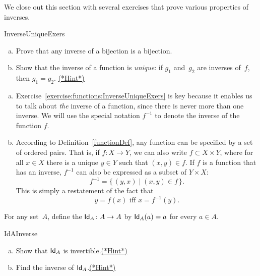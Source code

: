 We close out this section with several exercises that prove various properties of inverses.

 \begin{exercise}{InverseUniqueExers} 
 \begin{enumerate}[(a)]
 \item \label{InverseUniqueExers-bij}
 Prove that any inverse of a bijection is a bijection.

 \item \label{InverseUniqueExers-unique}
 Show that the inverse of a function is \emph{unique}: if $g_1$ and~$g_2$ are inverses of~$f$, then $g_1 = g_2$.
\hyperref[sec:functions:hints]{(*Hint*)} 
 \end{enumerate}
 \end{exercise}

\begin{rem}
\begin{enumerate}[(a)]
\item
Exercise~\ref{exercise:functions:InverseUniqueExers} is key because it enables us to talk about \emph{the} inverse of a function, since there is never more than one inverse. We will use the special notation $f^{-1}$ to denote the inverse of the function $f$.
\item
According to Definition~\ref{functionDef}, any function can be specified by a set of ordered pairs. That is, if $f:X \rightarrow Y$, we can also write $f \subset X \times Y$, where for all $x \in X$ there is a unique $y \in Y$ such that $(x,y) \in f$. If $f$ is a function that has an inverse, $f^{-1}$ can also be expressed as a subset of $Y \times X$: 
$$ f^{-1} = \{\, (y,x) \mid (x,y) \in f \,\} .$$
This is simply a restatement of the fact that
 $$y = f(x) \text{ iff } x = f^{-1}(y) .$$
\end{enumerate}
\end{rem}

\begin{defn}\label{def:identityMap}
For any set~$A$, define the  ${\sf Id}_A \colon A \to A$ by ${\sf Id}_A(a) = a$ for every $a \in A$.
\end{defn} 

\begin{exercise}{IdAInverse}
\begin{enumerate}[(a)]
\item
Show that ${\sf Id}_A$ is invertible.\hyperref[sec:functions:hints]{(*Hint*)}
\item
Find the inverse of ${\sf Id}_A$.\hyperref[sec:functions:hints]{(*Hint*)}
\end{enumerate}
\end{exercise}

